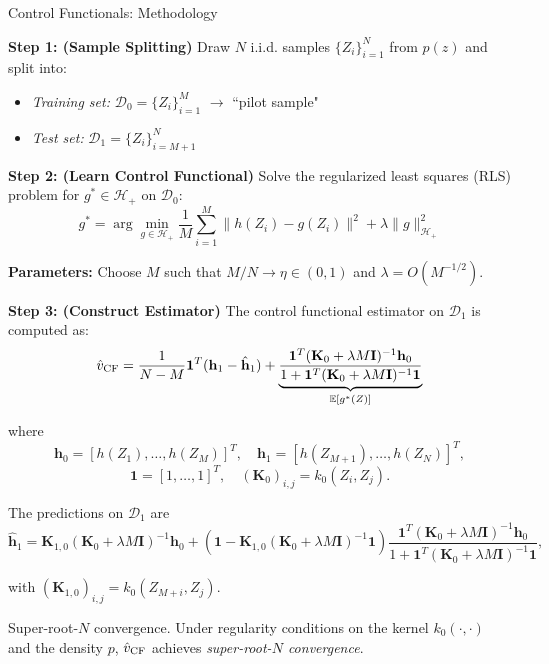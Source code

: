 \documentclass[9pt]{beamer}
\begin{document}
\begin{frame}{Control Functionals: Methodology}
\small

\textbf{Step 1: (Sample Splitting)} Draw $N$ i.i.d. samples $\{Z_i\}_{i=1}^N$ from $p(z)$ and split into:
\begin{itemize}
    \item \emph{Training set:} $\mathcal{D}_0 = \{Z_i\}_{i=1}^M$ $\rightarrow$ ``pilot sample"
    \item \emph{Test set:} $\mathcal{D}_1 = \{Z_i\}_{i=M+1}^N$
\end{itemize}

\vspace{0.5cm}

\textbf{Step 2: (Learn Control Functional)}  
Solve the regularized least squares (RLS) problem for $g^* \in \mathcal{H}_+$ on $\mathcal{D}_0$:
\begin{equation}
g^* = \arg \min_{g \in \mathcal{H}_+} \frac{1}{M} \sum_{i=1}^M \|h(Z_i) - g(Z_i)\|^2 + \lambda \|g\|_{\mathcal{H}_+}^2 \label{rls-eq} \tag{1} 
\end{equation}

\textbf{Parameters:} Choose $M$ such that $M/N \to \eta \in (0,1)$ and $\lambda = O(M^{-1/2})$.  


\end{frame}

\begin{frame}
\small
\textbf{Step 3: (Construct Estimator)}  
The control functional estimator on $\mathcal{D}_1$ is computed as:
\[
\hat{v}_{\rm CF} = \frac{1}{N-M} \mathbf{1}^T (\mathbf{h}_1 - \hat{\mathbf{h}}_1) + 
\underbrace{\frac{\mathbf{1}^T (\mathbf{K}_0 + \lambda M \mathbf{I})^{-1} \mathbf{h}_0}{1 + \mathbf{1}^T (\mathbf{K}_0 + \lambda M \mathbf{I})^{-1} \mathbf{1}}}_{\mathbb{E}[g^*(Z)]}
\]

where $$\mathbf{h}_0 = [h(Z_1), \dots, h(Z_M)]^T, \quad
\mathbf{h}_1 = [h(Z_{M+1}), \dots, h(Z_N)]^T,$$
$$\mathbf{1} = [1, \dots, 1]^T,
\quad
(\mathbf{K}_0)_{i,j} = k_0(Z_i, Z_j).
$$

The predictions on $\mathcal{D}_1$ are
$$\hat{\mathbf{h}}_1 = \mathbf{K}_{1,0} (\mathbf{K}_0 + \lambda M \mathbf{I})^{-1} \mathbf{h}_0 + (\mathbf{1} - \mathbf{K}_{1,0} (\mathbf{K}_0 + \lambda M \mathbf{I})^{-1} \mathbf{1}) 
\frac{\mathbf{1}^T (\mathbf{K}_0 + \lambda M \mathbf{I})^{-1} \mathbf{h}_0}{1 + \mathbf{1}^T (\mathbf{K}_0 + \lambda M \mathbf{I})^{-1} \mathbf{1}},
$$

with $(\mathbf{K}_{1,0})_{i,j} = k_0(Z_{M+i}, Z_j)$.
\vspace{0.3cm}

\begin{alertblock}{Super-root-$N$ convergence.}
    Under regularity conditions on the kernel $k_0(\cdot, \cdot)$ and the density $p$, $\hat{v}_{\rm CF}$ achieves \emph{super-root-$N$ convergence}\cite{cf}. 
\end{alertblock}

\end{frame}
\end{document}
